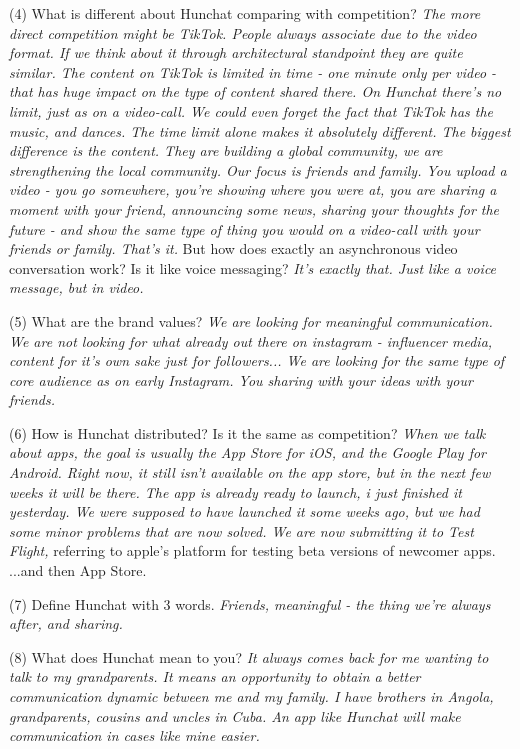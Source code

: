 \documentclass[12pt]{article}
\begin{document}
(4) What is different about Hunchat comparing with competition? \textit{The more direct competition might be TikTok. People always associate due to the video format. If we think about it through architectural standpoint they are quite similar. The content on TikTok is limited in time - one minute only per video - that has huge impact on the type of content shared there. On Hunchat there's no limit, just as on a video-call. We could even forget the fact that TikTok has the music, and dances. The time limit alone makes it absolutely different. The biggest difference is the content. They are building a global community, we are strengthening the local community. Our focus is friends and family. You upload a video - you go somewhere, you're showing where you were at,  you are sharing a moment with your friend, announcing some news, sharing your thoughts for the future - and show the same type of thing you would on a video-call with your friends or family. That's it.} But how does exactly an asynchronous video conversation work? Is it like voice messaging? \textit{It's exactly that. Just like a voice message, but in video.}

(5) What are the brand values? \textit{We are looking for meaningful communication. We are not looking for what already out there on instagram - influencer media, content for it's own sake just for followers... We are looking for the same type of core audience as on early Instagram. You sharing with your ideas with your friends.}

(6) How is Hunchat distributed? Is it the same as competition? \textit{When we talk about apps, the goal is usually the App Store for iOS, and the Google Play for Android. Right now, it still isn't available on the app store, but in the next few weeks it will be there. The app is already ready to launch, i just finished it yesterday. We were supposed to have launched it some weeks ago, but we had some minor problems that are now solved. We are now submitting it to Test Flight,} referring to apple's platform for testing beta versions of newcomer apps. {...and then App Store.}

(7) Define Hunchat with 3 words.  \textit{Friends, meaningful - the thing we're always after, and sharing.}

(8) What does Hunchat mean to you? \textit{It always comes back for me wanting to talk to my grandparents. It means an opportunity to obtain a better communication dynamic between me and my family. I have brothers in Angola, grandparents, cousins and uncles in Cuba. An app like Hunchat will make communication in cases like mine easier. }
\end{document}
